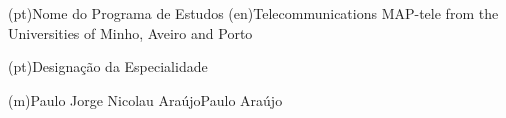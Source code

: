 \ntdegreename*(pt){Nome do Programa de Estudos}
\ntdegreename*(en){Telecommunications MAP-tele from the Universities of Minho, Aveiro and Porto}



\ntspecialization*(pt){Designação da Especialidade}







\ntauthorname(m){Paulo Jorge Nicolau Araújo}{Paulo Araújo}



